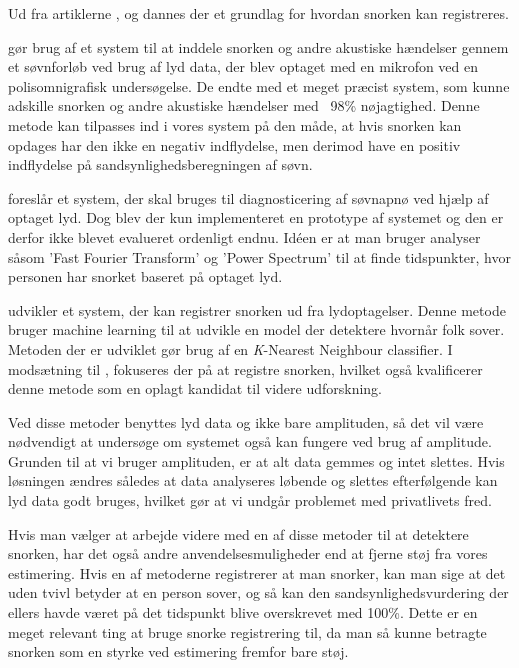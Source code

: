 Ud fra artiklerne \citet{Dafna2013}, \citet{Calabrese20111101} og \citet{7051338} dannes der et grundlag for hvordan snorken kan registreres.

\citet{Dafna2013} gør brug af et system til at inddele snorken og andre akustiske hændelser gennem et søvnforløb ved brug af lyd data, der blev optaget med en mikrofon ved en polisomnigrafisk undersøgelse. 
De endte med et meget præcist system, som kunne adskille snorken og andre akustiske hændelser med ~98\% nøjagtighed.
Denne metode kan tilpasses ind i vores system på den måde, at hvis snorken kan opdages har den ikke en negativ indflydelse, men derimod have en positiv indflydelse på sandsynlighedsberegningen af søvn. 

\citet{Calabrese20111101} foreslår et system, der skal bruges til diagnosticering af søvnapnø ved hjælp af optaget lyd.
Dog blev der kun implementeret en prototype af systemet og den er derfor ikke blevet evalueret ordenligt endnu. 
Idéen er at man bruger analyser såsom 'Fast Fourier Transform' og 'Power Spectrum' til at finde tidspunkter, hvor personen har snorket baseret på optaget lyd. 

\citet{7051338} udvikler et system, der kan registrer snorken ud fra lydoptagelser.
Denne metode bruger machine learning til at udvikle en model der detektere hvornår folk sover.
Metoden der er udviklet gør brug af en \textit{K}-Nearest Neighbour classifier.
I modsætning til \citet{Calabrese20111101}, fokuseres der på at registre snorken, hvilket også kvalificerer denne metode som en oplagt kandidat til videre udforskning.

Ved disse metoder benyttes lyd data og ikke bare amplituden, så det vil være nødvendigt at undersøge om systemet også kan fungere ved brug af amplitude.
Grunden til at vi bruger amplituden, er at alt data gemmes og intet slettes. 
Hvis løsningen ændres således at data analyseres løbende og slettes efterfølgende kan lyd data godt bruges, hvilket gør at vi undgår problemet med privatlivets fred.

Hvis man vælger at arbejde videre med en af disse metoder til at detektere snorken, har det også andre anvendelsesmuligheder end at fjerne støj fra vores estimering.
Hvis en af metoderne registrerer at man snorker, kan man sige at det uden tvivl betyder at en person sover, og så kan den sandsynlighedsvurdering der ellers havde været på det tidspunkt blive overskrevet med 100\%.
Dette er en meget relevant ting at bruge snorke registrering til, da man så kunne betragte snorken som en styrke ved estimering fremfor bare støj.
